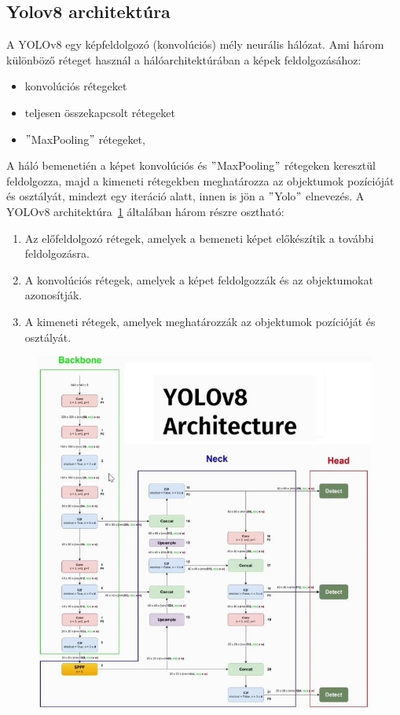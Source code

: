 \documentclass[12pt,oneside,a4paper]{article}
\theoremstyle{remark}
\begin{document}
	\subsection{Yolov8 architektúra}\label{subsec:yolov8-architektura}
	A YOLOv8 egy képfeldolgozó (konvolúciós) mély neurális hálózat.
	Ami három különböző réteget használ a hálóarchitektúrában a képek feldolgozásához:
	\begin{itemize}
		\item konvolúciós rétegeket
		\item teljesen összekapcsolt rétegeket
		\item \("\)MaxPooling\("\) rétegeket,
	\end{itemize}
	
	A háló bemenetién a képet  konvolúciós és \("\)MaxPooling\("\) rétegeken keresztül feldolgozza,
	majd a kimeneti rétegekben meghatározza az objektumok pozícióját és osztályát, mindezt egy iteráció alatt,
	innen is jön a \("\)\gls{Yolo}\("\) elnevezés.
	A YOLOv8 architektúra~\ref{fig:Yolov8} általában három részre osztható:
	\newpage
	\begin{enumerate}
		\item Az előfeldolgozó rétegek, amelyek a bemeneti képet előkészítik a további feldolgozásra.
		\item A konvolúciós rétegek, amelyek a képet feldolgozzák és az objektumokat azonosítják.
		\item A kimeneti rétegek, amelyek meghatározzák az objektumok pozícióját és osztályát.
	\end{enumerate}
	\begin{figure}[ht] %
		\centering
		\noindent\includegraphics[width=0.75\linewidth]{maxresdefault}
		\label{fig:Yolov8}
	\end{figure}
\end{document}
